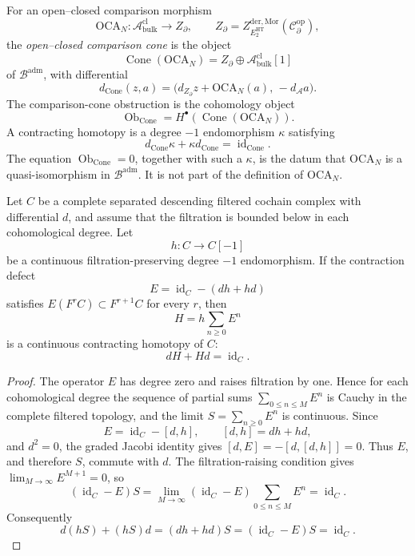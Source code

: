 \begin{defn}
\label{defn:oca-comparison-cone}
For an open--closed comparison morphism
\[
  \mathrm{OCA}_N\colon
  \mathcal A^{\mathrm{cl}}_{\mathrm{bulk}}
  \longrightarrow
  Z_\partial,\qquad
  Z_\partial=
  Z^{\mathrm{der},\mathrm{Mor}}_{E_2^{\mathrm{HT}}}
  (\mathcal C^{\mathrm{op}}_\partial),
\]
the \emph{open--closed comparison cone} is the object
\[
  \operatorname{Cone}(\mathrm{OCA}_N)
  =
  Z_\partial\oplus
  \mathcal A^{\mathrm{cl}}_{\mathrm{bulk}}[1]
\]
of \(\mathcal B^{\mathrm{adm}}\), with differential
\[
  d_{\operatorname{Cone}}(z,a)
  =
  \bigl(d_{Z_\partial}z+\mathrm{OCA}_N(a),\,
        -d_{\mathcal A}a\bigr).
\]
The comparison-cone obstruction is the cohomology object
\[
  \operatorname{Ob}_{\operatorname{Cone}}
  =
  H^\bullet\!\left(\operatorname{Cone}(\mathrm{OCA}_N)\right).
\]
A contracting homotopy is a degree \(-1\) endomorphism
\(\kappa\) satisfying
\[
  d_{\operatorname{Cone}}\kappa+\kappa d_{\operatorname{Cone}}
  =\operatorname{id}_{\operatorname{Cone}}.
\]
The equation \(\operatorname{Ob}_{\operatorname{Cone}}=0\), together
with such a \(\kappa\), is the datum that \(\mathrm{OCA}_N\) is a
quasi-isomorphism in \(\mathcal B^{\mathrm{adm}}\).  It is not part of
the definition of \(\mathrm{OCA}_N\).
\end{defn}

\begin{lem}
\label{lem:complete-filtered-contraction-lift}
Let \(C\) be a complete separated descending filtered cochain complex
with differential \(d\), and assume that the filtration is bounded
below in each cohomological degree.  Let
\[
  h\colon C\longrightarrow C[-1]
\]
be a continuous filtration-preserving degree \(-1\) endomorphism.  If
the contraction defect
\[
  E=\operatorname{id}_C-(dh+hd)
\]
satisfies \(E(F^rC)\subset F^{r+1}C\) for every \(r\), then
\[
  H=h\sum_{n\ge0}E^n
\]
is a continuous contracting homotopy of \(C\):
\[
  dH+Hd=\operatorname{id}_C .
\]
\end{lem}

\begin{proof}
The operator \(E\) has degree zero and raises filtration by one.  Hence
for each cohomological degree the sequence of partial sums
\(\sum_{0\le n\le M}E^n\) is Cauchy in the complete filtered topology,
and the limit \(S=\sum_{n\ge0}E^n\) is continuous.  Since
\[
  E=\operatorname{id}_C-[d,h],
  \qquad [d,h]=dh+hd,
\]
and \(d^2=0\), the graded Jacobi identity gives
\([d,E]=-[d,[d,h]]=0\).  Thus \(E\), and therefore \(S\), commute with
\(d\).  The filtration-raising condition gives
\(\lim_{M\to\infty}E^{M+1}=0\), so
\[
  (\operatorname{id}_C-E)S
  =
  \lim_{M\to\infty}
  (\operatorname{id}_C-E)\sum_{0\le n\le M}E^n
  =
  \operatorname{id}_C .
\]
Consequently
\[
  d(hS)+(hS)d
  =
  (dh+hd)S
  =
  (\operatorname{id}_C-E)S
  =
  \operatorname{id}_C .
\]
\end{proof}

